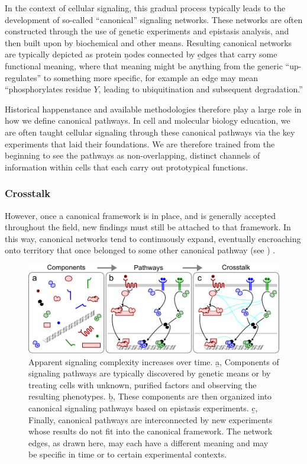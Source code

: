 In the context of cellular signaling, this gradual process typically leads
to the development of so-called ``canonical'' signaling networks. These
networks are often constructed through the use of genetic experiments and
epistasis analysis, and then built upon by biochemical and other means.
Resulting canonical networks are typically depicted as protein \b{nodes} connected by
\b{edges} that carry some functional meaning, where that meaning might
be anything from the generic
``up-regulates'' to something more specific, for example an edge may mean
``phosphorylates residue $Y$, leading to ubiquitination and subsequent
degradation.''


Historical happenstance and available methodologies therefore play a large role in
how we define
canonical pathways. In cell and molecular biology education, we are often
taught cellular signaling through these canonical pathways
via the key experiments that laid their
foundations. We are therefore trained from the beginning to see the pathways as
non-overlapping, distinct channels of information
within cells that each carry out prototypical functions.


\subsubsection{Crosstalk}

However, once a canonical framework is in place, and is
generally accepted throughout the field, new findings must still
be attached to that framework. In this way, canonical networks tend to
continuously expand, eventually encroaching onto territory that once
belonged to some other canonical pathway
(see )  \cite{Kholodenko2006}.


  \begin{figure}[!bt]
  \centering
  \includegraphics[width=6in]{FIGS/introduction/complexity.pdf}
  {\singlespacing 
  \caption[ Apparent signaling complexity increases over time.]
            { Apparent signaling complexity increases over time.
			\b{a}, Components of signaling pathways are typically discovered by
			genetic means or by treating cells with unknown, purified factors and
            observing the resulting phenotypes.
			\b{b}, These components are then organized into canonical signaling
			pathways based on epistasis experiments. \b{c}, Finally, canonical pathways
			are interconnected by new experiments whose results
			do not fit into the canonical framework. The network edges, as drawn here,
            may each have a different meaning and may be specific in time or to
            certain experimental contexts.}
  \label{fig:introduction:complexity}}
  \end{figure}


